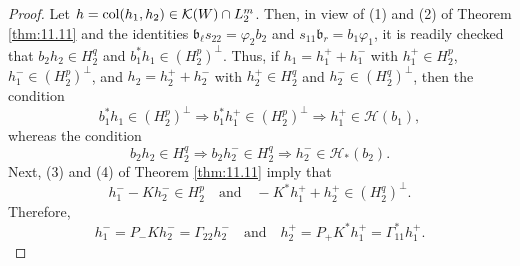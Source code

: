 \documentclass[12pt,twoside,a4paper]{amsart}
\theoremstyle{definition}
\numberwithin{equation}{section}
\begin{document}
\begin{proof} Let $h=\textup{col}(h_1,h_2)\in{{\mathcal K}}(W)\cap L_2^m$. Then,
in view of (1) and (2) of Theorem \ref{thm:11.11} and the identities
${{\mathfrak b}}_\ell s_{22}=\varphi_2b_2$ and $s_{11}{{\mathfrak b}}_r=b_1\varphi_1$, it is
readily checked that
$b_2h_2\in H_2^q$ and $b_1^*h_1\in (H_2^p)^\perp$. Thus, if $h_1=h_1^++h_1^-$
with $h_1^+\in H_2^p$,  $h_1^-\in (H_2^p)^\perp$, and $h_2=h_2^++h_2^-$
with $h_2^+\in H_2^q$ and $h_2^-\in (H_2^q)^\perp$, then the condition
$$
b_1^*h_1\in (H_2^p)^\perp\Longrightarrow b_1^*h_1^+\in (H_2^p)^\perp
\Longrightarrow h_1^+\in{{\mathcal H}}(b_1),
$$
whereas the condition
$$
b_2h_2\in H_2^q\Longrightarrow b_2h_2^-\in H_2^q
\Longrightarrow h_2^-\in{{\mathcal H}}_*(b_2).
$$
Next, (3) and (4) of Theorem \ref{thm:11.11} imply that
$$
h_1^- - Kh_2^-\in H_2^p\quad\textrm{and}\quad -K^*h_1^+ +h_2^+\in
(H_2^q)^\perp.
$$
Therefore,
$$
h_1^-=P_-Kh_2^-=\Gamma_{22}h_2^-\quad\textrm{and}\quad h_2^+=P_+K^*h_1^+=
\Gamma_{11}^*h_1^+.
$$


\end{proof}
\end{document}

